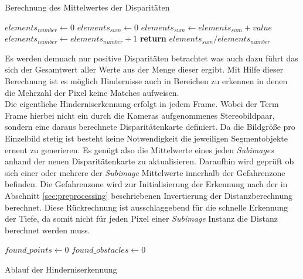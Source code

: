 \begin{algorithm}[h]
\caption{Berechnung des Mittelwertes der Disparitäten}
\label{alg:mean_disparity_calculation}
\begin{algorithmic}[1]
        \State $elements_{number} \gets 0$
        \State $elements_{sum} \gets 0 $
                \State $elements_{sum} \gets elements_{sum} + value$
                \State $elements_{number} \gets elements_{number} + 1$
            \EndIf
        \EndFor
        \State \textbf{return} $elements_{sum} / elements_{number}$
    \EndProcedure
\end{algorithmic}  
\end{algorithm}

\noindent
Es werden demnach nur positive Disparitäten betrachtet was auch dazu führt das sich der Gesamtwert aller Werte aus der Menge dieser ergibt. Mit Hilfe dieser Berechnung ist es möglich Hindernisse auch in Bereichen zu erkennen in denen die Mehrzahl der Pixel keine Matches aufweisen.\\

\noindent
Die eigentliche Hinderniserkennung erfolgt in jedem Frame. Wobei der Term Frame hierbei nicht ein durch die Kameras aufgenommenes Stereobildpaar, sondern eine daraus berechnete Disparitätenkarte definiert. Da die Bildgröße pro Einzelbild stetig ist besteht keine Notwendigkeit die jeweiligen Segmentobjekte erneut zu generieren. Es genügt also die Mittelwerte eines jeden \emph{Subimages} anhand der neuen Disparitätenkarte zu aktualisieren. Daraufhin wird geprüft ob sich einer oder mehrere der \emph{Subimage} Mittelwerte innerhalb der Gefahrenzone befinden. Die Gefahrenzone wird zur Initialisierung der Erkennung nach der in Abschnitt \ref{sec:preprocessing} beschriebenen Invertierung der Distanzberechnung berechnet. Diese Rückrechnung ist ausschlaggebend für die schnelle Erkennung der Tiefe, da somit nicht für jeden Pixel einer \emph{Subimage} Instanz die Distanz berechnet werden muss.\\ 

\begin{algorithm}[h]
\begin{algorithmic}[1]
		\State $found\_points \gets 0$
		\State $found\_obstacles \gets 0$
			\EndIf
		\EndFor
		\EndIf 
    \EndProcedure
\end{algorithmic}
\caption{Ablauf der Hinderniserkennung}
\label{alg:mean_disparity_detection}
\end{algorithm}

